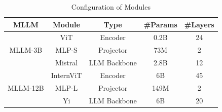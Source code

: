 \documentclass[conference]{IEEEtran}
\newcommand\xrowht[2][0]{\addstackgap[.5\dimexpr#2\relax]{\vphantom{#1}}}
\begin{document}

\vspace{-3mm}
\begin{table}[ht]
\begin{center}
\centering
    \caption{Configuration of Modules}
    \renewcommand{\arraystretch}{0.9}
    \setlength{\tabcolsep}{5pt}
    \setlength{\arrayrulewidth}{1pt}
    \begin{tabular}{c|cccc}
    \toprule
    \multicolumn{1}{c}{MLLM} & Module & Type & \#Params & \#Layers \\  
    \midrule
    \multirow{3}{*}{MLLM-3B} 
        & ViT      & Encoder       & 0.2B  & 24 \\
        & MLP-S    & Projector     & 73M   & 2 \\
        & Mistral  & LLM Backbone  & 2.8B  & 12 \\
    \midrule
    \multirow{3}{*}{MLLM-12B} 
        & InternViT & Encoder       & 6B    & 45 \\
        & MLP-L     & Projector     & 149M  & 2 \\
        & Yi        & LLM Backbone  & 6B    & 20 \\
    \bottomrule
    \end{tabular}
\label{config:module}
\end{center}
\vspace{-3mm}
\end{table}
\end{document}
